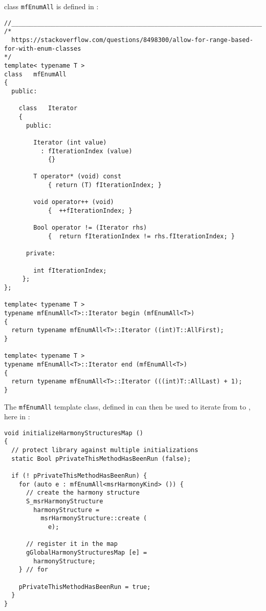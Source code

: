 class   {\tt mfEnumAll} is defined in :
\begin{lstlisting}[language=CPlusPlus]
//______________________________________________________________________________
/*
  https://stackoverflow.com/questions/8498300/allow-for-range-based-for-with-enum-classes
*/
template< typename T >
class   mfEnumAll
{
  public:

    class   Iterator
    {
      public:

        Iterator (int value)
          : fIterationIndex (value)
            {}

        T operator* (void) const
            { return (T) fIterationIndex; }

        void operator++ (void)
            {  ++fIterationIndex; }

        Bool operator != (Iterator rhs)
            {  return fIterationIndex != rhs.fIterationIndex; }

      private:

        int fIterationIndex;
     };
};

template< typename T >
typename mfEnumAll<T>::Iterator begin (mfEnumAll<T>)
{
  return typename mfEnumAll<T>::Iterator ((int)T::AllFirst);
}

template< typename T >
typename mfEnumAll<T>::Iterator end (mfEnumAll<T>)
{
  return typename mfEnumAll<T>::Iterator (((int)T::AllLast) + 1);
}
\end{lstlisting}

The {\tt mfEnumAll} template class, defined in  can then be used to iterate from  to , here in :
\begin{lstlisting}[language=CPlusPlus]
void initializeHarmonyStructuresMap ()
{
  // protect library against multiple initializations
  static Bool pPrivateThisMethodHasBeenRun (false);

  if (! pPrivateThisMethodHasBeenRun) {
    for (auto e : mfEnumAll<msrHarmonyKind> ()) {
      // create the harmony structure
      S_msrHarmonyStructure
        harmonyStructure =
          msrHarmonyStructure::create (
            e);

      // register it in the map
      gGlobalHarmonyStructuresMap [e] =
        harmonyStructure;
    } // for

    pPrivateThisMethodHasBeenRun = true;
  }
}
\end{lstlisting}


